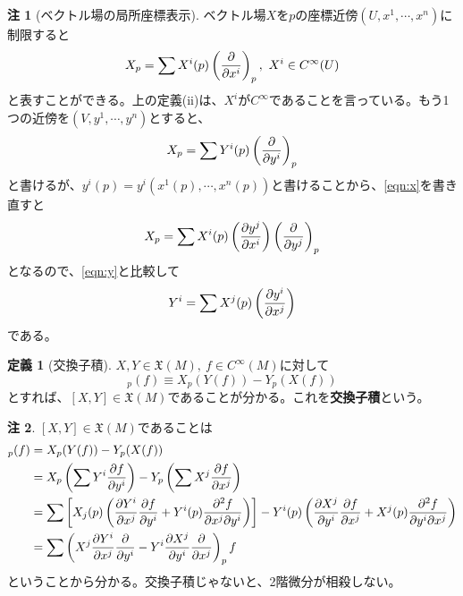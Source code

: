 \documentclass[unicode,a4paper,11pt]{ltjsarticle}
\theoremstyle{definition}
\newtheorem{dfn}{定義}[section]
\newtheorem{rmk}{注}[section]
\begin{document}
\begin{rmk}[ベクトル場の局所座標表示]
  ベクトル場$X$を$p$の座標近傍$(U,x^{1},\cdots,x^{n})$に制限すると
  \begin{equation}
    X_{p}
    =
    \sum X^{i}(p)\left( \pdv{}{x^{i}} \right)_{p}
    ,\
    X^{i}\in C^{\infty}(U)
    \label{eqn:x}
  \end{equation}
  と表すことができる。上の定義(ii)は、$X^{i}$が$C^{\infty}$であることを言っている。もう1つの近傍を$(V,y^{1},\cdots,y^{n})$とすると、
  \begin{equation}
    X_{p}
    =
    \sum Y^{i}(p)\left( \pdv{}{y^{i}} \right)_{p}
    \label{eqn:y}
  \end{equation}
  と書けるが、$y^{i}(p)=y^{i}(x^{1}(p),\cdots,x^{n}(p))$と書けることから、\eqref{eqn:x}を書き直すと
  \begin{equation}
    X_{p}
    =
    \sum X^{i}(p)\left( \pdv{y^{j}}{x^{i}} \right)\left( \pdv{}{y^{j}} \right)_{p}
  \end{equation}
  となるので、\eqref{eqn:y}と比較して
  \begin{equation}
    Y^{i}
    =
    \sum X^{j}(p)\left( \pdv{y^{i}}{x^{j}} \right)
  \end{equation}
  である。
\end{rmk}

\begin{dfn}[交換子積]
  $X,Y\in\mathfrak{X}(M),\ f\in C^{\infty}(M)$に対して
  \begin{equation}
    [X,Y]_{p}(f)
    \equiv
    X_{p}(Y(f))
    -
    Y_{p}(X(f))
  \end{equation}
  とすれば、$[X,Y]\in\mathfrak{X}(M)$であることが分かる。これを\textbf{交換子積}という。
\end{dfn}

\begin{rmk}
  $[X,Y]\in\mathfrak{X}(M)$であることは
  \begin{align}
    [X,Y]_{p}(f)
     & =
    X_{p}(Y(f))
    -
    Y_{p}(X(f))
    \nonumber
    \\
     & =
    X_{p}
    \left(
    \sum Y^{i}\pdv{f}{y^{i}}
    \right)
    -
    Y_{p}
    \left(
    \sum X^{j}\pdv{f}{x^{j}}
    \right)
    \nonumber
    \\
     & =
    \sum\left[
      X_{j}(p)
      \left(
      \pdv{Y^{i}}{x^{j}}\pdv{f}{y^{i}}
      +
      Y^{i}(p)\pdv{f}{x^{j}}{y^{i}}
      \right)
      \right]
    -
    Y^{i}(p)
    \left(
    \pdv{X^{j}}{y^{i}}\pdv{f}{x^{j}}
    +
    X^{j}(p)\pdv{f}{y^{i}}{x^{j}}
    \right)
    \nonumber
    \\
     & =
    \sum
    \left(
    X^{j}\pdv{Y^{i}}{x^{j}}\pdv{}{y^{i}}
    -
    Y^{i}\pdv{X^{j}}{y^{i}}\pdv{}{x^{j}}
    \right)_{p}
    f
  \end{align}
  ということから分かる。交換子積じゃないと、2階微分が相殺しない。
\end{rmk}
\end{document}
